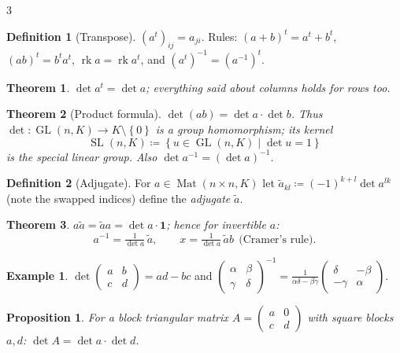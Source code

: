 \documentclass[10pt,a4paper,landscape]{article}
\theoremstyle{definition}
\newtheorem{defn}{Definition}[section]
\newtheorem{exm}{Example}[section]
\theoremstyle{plain}
\newtheorem{thm}{Theorem}[section]
\newtheorem{prop}{Proposition}[section]
\theoremstyle{remark}
\newcommand{\set}[1]{\left\{ #1 \right\}}
\newcommand{\deq}{\coloneqq}
\DeclareMathOperator{\Mat}{Mat}
\DeclareMathOperator{\GL}{GL}
\DeclareMathOperator{\SLgrp}{SL}
\DeclareMathOperator{\rk}{rk}
\newcommand{\one}{\mathbf{1}}
\begin{document}
\begin{multicols*}{3}
\begin{defn}[Transpose]
$(a^t)_{ij} = a_{ji}$. Rules: $(a+b)^t = a^t + b^t$, $(ab)^t = b^t a^t$, $\rk a = \rk a^t$, and $(a^t)^{-1} = (a^{-1})^t$.
\end{defn}

\begin{thm}
$\det a^t = \det a$; everything said about columns holds for rows too.
\end{thm}

\begin{thm}[Product formula]
$\det(ab) = \det a \cdot \det b$. Thus $\det: \GL(n,K) \to K \setminus \set{0}$ is a group homomorphism; its kernel
\[
\SLgrp(n,K) \deq \set{u \in \GL(n,K) \mid \det u = 1}
\]
is the \emph{special linear group}. Also $\det a^{-1} = (\det a)^{-1}$.
\end{thm}

\begin{defn}[Adjugate]
For $a \in \Mat(n \times n, K)$ let $\tilde a_{kl} \deq (-1)^{k+l} \det a^{lk}$ (note the swapped indices) define the \emph{adjugate} $\tilde a$.
\end{defn}

\begin{thm}
$a \tilde a = \tilde a a = \det a \cdot \one$; hence for invertible $a$:
\[
a^{-1} = \tfrac{1}{\det a}\, \tilde a, \qquad x = \tfrac{1}{\det a}\, \tilde a b \ \ \text{(Cramer's rule).}
\]
\end{thm}

\begin{exm}
$\det \left(\begin{smallmatrix} a & b \\ c & d \end{smallmatrix}\right) = ad - bc$ and
$\left(\begin{smallmatrix} \alpha & \beta \\ \gamma & \delta \end{smallmatrix}\right)^{-1} = \frac{1}{\alpha\delta - \beta\gamma}\left(\begin{smallmatrix} \delta & -\beta \\ -\gamma & \alpha \end{smallmatrix}\right)$.
\end{exm}

\begin{prop}
For a block triangular matrix $A = \left(\begin{smallmatrix} a & 0 \\ c & d \end{smallmatrix}\right)$ with square blocks $a, d$: $\det A = \det a \cdot \det d$.
\end{prop}


\end{multicols*}
\end{document}
